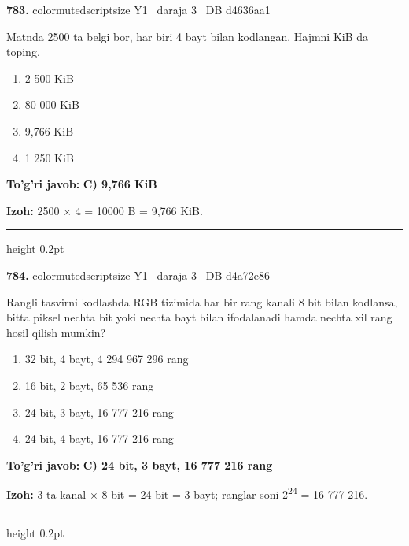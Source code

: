 \documentclass[10pt,a4paper,oneside]{article}
\begin{document}
\noindent\textbf{\color{ink}783.}  {color{muted}scriptsize Y1 \textbullet\ daraja 3 \textbullet\ DB d4636aa1}
\par
Matnda 2500 ta belgi bor, har biri 4 bayt bilan kodlangan. Hajmni KiB da toping.
\begin{enumerate}[label=\Alph*),leftmargin=9mm]
\item 2 500 KiB
\item 80 000 KiB
\item 9,766 KiB
\item 1 250 KiB
\end{enumerate}
\begin{tcolorbox}[enhanced,breakable,colback=teal!4,colframe=teal!50!black,boxrule=0.5pt,arc=1.1mm,left=3mm,right=3mm,top=1.7mm,bottom=1.7mm,before skip=2mm,after skip=2mm]
\textbf{\color{teal}To'g'ri javob:} \textbf{C) 9,766 KiB}
\par\smallskip
\textbf{Izoh:} 2500 \ensuremath{\times} 4 = 10000 B = 9,766 KiB.
\end{tcolorbox}
\vspace{2mm}\hrule height 0.2pt \vspace{3mm}

\noindent\textbf{\color{ink}784.}  {color{muted}scriptsize Y1 \textbullet\ daraja 3 \textbullet\ DB d4a72e86}
\par
Rangli tasvirni kodlashda RGB tizimida har bir rang kanali 8 bit bilan kodlansa, bitta piksel nechta bit yoki nechta bayt bilan ifodalanadi hamda nechta xil rang hosil qilish mumkin?
\begin{enumerate}[label=\Alph*),leftmargin=9mm]
\item 32 bit, 4 bayt, 4 294 967 296 rang
\item 16 bit, 2 bayt, 65 536 rang
\item 24 bit, 3 bayt, 16 777 216 rang
\item 24 bit, 4 bayt, 16 777 216 rang
\end{enumerate}
\begin{tcolorbox}[enhanced,breakable,colback=teal!4,colframe=teal!50!black,boxrule=0.5pt,arc=1.1mm,left=3mm,right=3mm,top=1.7mm,bottom=1.7mm,before skip=2mm,after skip=2mm]
\textbf{\color{teal}To'g'ri javob:} \textbf{C) 24 bit, 3 bayt, 16 777 216 rang}
\par\smallskip
\textbf{Izoh:} 3 ta kanal \ensuremath{\times} 8 bit = 24 bit = 3 bayt; ranglar soni 2\textsuperscript{2}\textsuperscript{4} = 16 777 216.
\end{tcolorbox}
\vspace{2mm}\hrule height 0.2pt \vspace{3mm}
\end{document}

